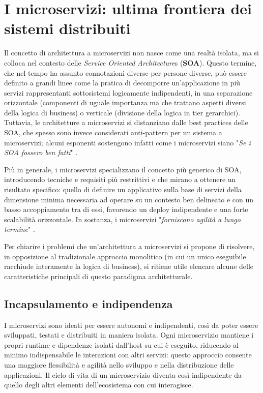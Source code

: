 \section{I microservizi: ultima frontiera dei sistemi distribuiti}
Il concetto di architettura a microservizi non nasce come una realtà isolata, ma si colloca nel contesto delle \emph{Service Oriented Architecture}s (\textbf{SOA}). Questo termine, che nel tempo ha assunto connotazioni diverse per persone diverse, può essere definito a grandi linee come la pratica di decomporre un'applicazione in più servizi rappresentanti sottosistemi logicamente indipendenti, in una separazione orizzontale (componenti di uguale importanza ma che trattano aspetti diversi della logica di business) o verticale (divisione della logica in tier gerarchici).
Tuttavia, le architetture a microservizi si distanziano dalle best practices delle SOA, che spesso sono invece considerati anti-pattern per un sistema a microservizi; alcuni esponenti sostengono infatti come i microservizi siano "\emph{Se i SOA fossero ben fatti}" \cite[p.25]{.NET_Microservices}.

Più in generale, i microservizi specializzano il concetto più generico di SOA, introducendo tecniche e requisiti più restrittivi e che mirano a ottenere un risultato specifico: quello di definire un applicativo sulla base di servizi della dimensione minima necessaria ad operare su un contesto ben delineato e con un basso accoppiamento tra di essi, favorendo un deploy indipendente e una forte scalabilità orizzontale. In sostanza, i microservizi "\emph{forniscono agilità a lungo termine}" \cite[p.25]{.NET_Microservices}.

Per chiarire i problemi che un'architettura a microservizi si propone di risolvere, in opposizione al tradizionale approccio monolitico (in cui un unico eseguibile racchiude interamente la logica di business), si ritiene utile elencare alcune delle caratteristiche principali di questo paradigma architetturale.

\subsection{Incapsulamento e indipendenza}
I microservizi sono ideati per essere autonomi e indipendenti, così da poter essere sviluppati, testati e distribuiti in maniera isolata. Ogni microservizio mantiene i propri runtime e dipendenze isolati dall'host su cui è eseguito, riducendo al minimo indispensabile le interazioni con altri servizi: questo approccio consente una maggiore flessibilità e agilità nello sviluppo e nella distribuzione delle applicazioni. Il ciclo di vita di un microservizio diventa così indipendente da quello degli altri elementi dell'ecosistema con cui interagisce.

